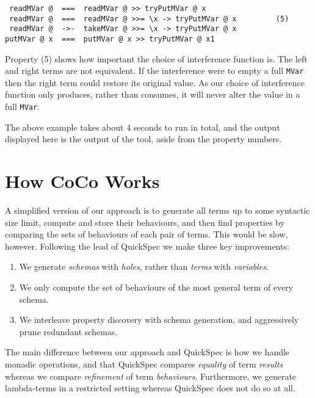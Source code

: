 \begin{verbatim}
 readMVar @  ===  readMVar @ >> tryPutMVar @ x
 readMVar @  ===  readMVar @ >>= \x -> tryPutMVar @ x         (5)
 readMVar @  ->-  takeMVar @ >>= \x -> tryPutMVar @ x
putMVar @ x  ===  putMVar @ x >> tryPutMVar @ x1
\end{verbatim}

\noindent
Property (5) shows how important the choice of interference function
is.  The left and right terms are not equivalent.  If the interference
were to empty a full \verb|MVar| then the right term could restore its
original value.  As our choice of interference function only produces,
rather than consumes, it will never alter the value in a full
\verb|MVar|.

The above example takes about 4 seconds to run in total, and the
output displayed here is the output of the tool, aside from the
property numbers.

\section{How CoCo Works}
\label{sec:coco-hiw}


A simplified version of our approach is to generate all terms up to
some syntactic size limit, compute and store their behaviours, and
then find properties by comparing the sets of behaviours of each pair
of terms.  This would be slow, however.  Following the lead of
QuickSpec\cite{claessen2010,smallbone2017} we make three key
improvements:

\begin{enumerate}
\item We generate \emph{schemas} with \emph{holes}, rather than
  \emph{terms} with \emph{variables}.
\item We only compute the set of behaviours of the most general term
  of every schema.
\item We interleave property discovery with schema generation, and
  aggressively prune redundant schemas.
\end{enumerate}

The main difference between our approach and QuickSpec is how we
handle monadic operations, and that QuickSpec compares \emph{equality}
of term \emph{results} whereas we compare \emph{refinement} of term
\emph{behaviours}.  Furthermore, we generate lambda-terms in a
restricted setting whereas QuickSpec does not do so at all.

